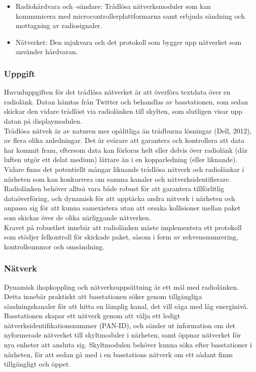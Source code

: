 \documentclass[a4paper,11pt]{article}
\begin{document}
	\begin{itemize}
	\item Radiohårdvara och -sändare: Trådlösa nätverksmoduler som kan kommunicera med microcontrollerplattformarna samt erbjuda sändning och mottagning av radiosignaler.
    	\item Nätverket: Den mjukvara och det protokoll som bygger upp nätverket som använder hårdvaran.
	\end{itemize}
	
\subsubsection{Uppgift}
Huvuduppgiften för det trådlösa nätverket är att överföra textdata över en radiolänk. Datan hämtas från Twitter och behandlas av basstationen, som sedan skickar den vidare trådlöst via radiolänken till skylten, som slutligen visar upp datan på displaymodulen. \\

Trådlösa nätvek är av naturen mer opålitliga än trådburna lösningar (Dell, 2012), av flera olika anledningar. Det är svårare att garantera och kontrollera att data har kommit fram, eftersom data kan förloras helt eller delvis över radiolänk (där luften utgör ett delat medium) lättare än i en kopparledning (eller liknande). Vidare finns det potentiellt mångar liknande trådlösa nätverk och radiolänkar i närheten som kan konkurrera om samma kanaler och nätverksidentifierare. Radiolänken behöver alltså vara både robust för att garantera tillförlitlig dataöverföring, och dynamisk för att upptäcka andra nätverk i närheten och anpassa sig för att kunna samexistera utan att orsaka kollisioner mellan paket som skickas över de olika närliggande nätverken. \\

Kravet på robusthet innebär att radiolänken måste implementera ett protokoll som stödjer felkontroll för skickade paket, såsom i form av sekvensnumrering, kontrollsummor och omsändning.

\subsubsection{Nätverk}
Dynamisk ihopkoppling och nätverksuppsättning är ett mål med radiolänken. Detta innebär praktiskt att basstationen söker genom tillgängliga sändningskanaler för att hitta en lämplig kanal, det vill säga med låg energinivå. Basstationen skapar ett nätverk genom att välja ett ledigt nätverksidentifikationsnummer (PAN-ID), och sänder ut information om det nyformerade nätverket till skyltmoduler i närheten, samt öppnar nätverket för nya enheter att ansluta sig. Skyltmodulen behöver kunna söka efter basstationer i närheten, för att sedan gå med i en basstations nätverk om ett sådant finns tillgängligt och öppet. \\
\end{document}
